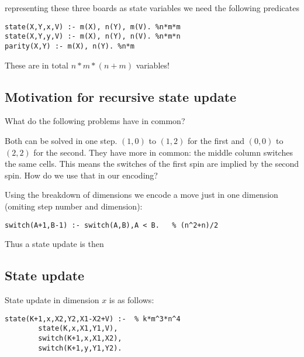 \documentclass[]{llncs}
\newcommand{\spintable}[9]{
\node [matrix,ampersand replacement=\&,nodes={minimum size=4mm}]%
    {
    \node {#1}; \& \node{#2}; \& \node {#3}; \\
    \node {#4}; \& \node{#5}; \& \node {#6}; \\
    \node {#7}; \& \node{#8}; \& \node {#9}; \\
    };
}
\begin{document}
representing these three boards as state variables we need the following predicates

\begin{verbatim}
state(X,Y,x,V) :- m(X), n(Y), m(V). %n*m*m
state(X,Y,y,V) :- m(X), n(Y), n(V). %n*m*n
parity(X,Y) :- m(X), n(Y). %n*m
\end{verbatim}

These are in total $n*m*(n+m)$ variables!

\subsection{Motivation for recursive state update}

What do the following problems have in common? 


Both can be solved in one step. $(1,0)$ to $(1,2)$ for the first and $(0,0)$ to $(2,2)$ for the second. They have
more in common: the middle column switches the same cells. This means the switches of the first spin are implied by the second spin. How
do we use that in our encoding?

Using the breakdown of dimensions we encode a move just in one dimension (omiting step number and dimension):

\begin{verbatim}
switch(A+1,B-1) :- switch(A,B),A < B.   % (n^2+n)/2
\end{verbatim}

Thus a state update is then 


\subsection{State update}
State update in dimension $x$ is as follows:

\begin{verbatim}
state(K+1,x,X2,Y2,X1-X2+V) :-  % k*m^3*n^4
        state(K,x,X1,Y1,V), 
        switch(K+1,x,X1,X2),
        switch(K+1,y,Y1,Y2).
\end{verbatim}
\end{document}
